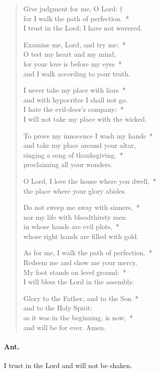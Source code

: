 \documentclass[12pt,twocolumn,letterpaper]{book}
\begin{document}
\begin{verse}
Give judgment for me, O Lord: †\\
for I walk the path of perfection.~*\\
I trust in the Lord; I have not wavered.

Examine me, Lord, and try me;~*\\
O test my heart and my mind,\\
for your love is before my eyes~*\\
and I walk according to your truth.

I never take my place with liars~*\\
and with hypocrites I shall not go.\\
I hate the evil-doer’s company:~*\\
I will not take my place with the wicked.

To prove my innocence I wash my hands~*\\
and take my place around your altar,\\
singing a song of thanksgiving,~*\\
proclaiming all your wonders.

O Lord, I love the house where you dwell,~*\\
the place where your glory abides.

Do not sweep me away with sinners,~*\\
nor my life with bloodthirsty men\\
in whose hands are evil plots,~*\\
whose right hands are filled with gold.

As for me, I walk the path of perfection.~*\\
Redeem me and show me your mercy.\\
My foot stands on level ground:~*\\
I will bless the Lord in the assembly.

Glory to the Father, and to the Son~*\\
and to the Holy Spirit:\\
as it was in the beginning, is now,~*\\
and will be for ever. Amen.
\end{verse}

\paragraph{Ant.}{I trust in the Lord and will not be shaken.}
\end{document}
